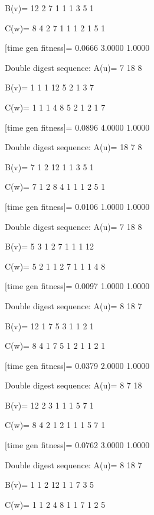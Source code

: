 B(v)=
    12     2     7     1     1     1     3     5     1

C(w)=
     8     4     2     7     1     1     1     2     1     5     1

[time gen fitness]=
    0.0666    3.0000    1.0000

Double digest sequence:
A(u)=
     7    18     8

B(v)=
     1     1     1    12     5     2     1     3     7

C(w)=
     1     1     1     4     8     5     2     1     2     1     7

[time gen fitness]=
    0.0896    4.0000    1.0000

Double digest sequence:
A(u)=
    18     7     8

B(v)=
     7     1     2    12     1     1     3     5     1

C(w)=
     7     1     2     8     4     1     1     1     2     5     1

[time gen fitness]=
    0.0106    1.0000    1.0000

Double digest sequence:
A(u)=
     7    18     8

B(v)=
     5     3     1     2     7     1     1     1    12

C(w)=
     5     2     1     1     2     7     1     1     1     4     8

[time gen fitness]=
    0.0097    1.0000    1.0000

Double digest sequence:
A(u)=
     8    18     7

B(v)=
    12     1     7     5     3     1     1     2     1

C(w)=
     8     4     1     7     5     1     2     1     1     2     1

[time gen fitness]=
    0.0379    2.0000    1.0000

Double digest sequence:
A(u)=
     8     7    18

B(v)=
    12     2     3     1     1     1     5     7     1

C(w)=
     8     4     2     1     2     1     1     1     5     7     1

[time gen fitness]=
    0.0762    3.0000    1.0000

Double digest sequence:
A(u)=
     8    18     7

B(v)=
     1     1     2    12     1     1     7     3     5

C(w)=
     1     1     2     4     8     1     1     7     1     2     5

